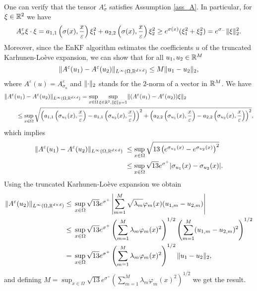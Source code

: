 One can verify that the tensor $A^{\varepsilon}_{\sigma}$ satisfies Assumption \ref{ass_A}. In particular, for $\xi \in \mathbb{R}^2$ we have
\begin{equation*}
A^{\varepsilon}_{\sigma} \xi \cdot \xi = a_{1,1} \left ( \sigma(x), \frac{x}{\varepsilon} \right ) \xi_1^2 + a_{2,2} \left ( \sigma(x), \frac{x}{\varepsilon} \right ) \xi_2^2 \ge e^{\sigma(x)} ( \xi_1^2 + \xi_2^2 ) = e^{\sigma_-} \lVert\xi\rVert_2^2.
\end{equation*}
Moreover, since the $\mathrm{EnKF}$ algorithm estimates the coefficients $u$ of the truncated Karhunen-Lo\`eve expansion, we can show that for all $u_1, u_2 \in \mathbb{R}^M$
\begin{equation*}
\lVert A^{\varepsilon}(u_1) - A^{\varepsilon}(u_2)\rVert_{L^{\infty}(\Omega, \mathbb{R}^{d \times d})} \le M \lVert u_1 - u_2\rVert_2,
\end{equation*}
where $A^{\varepsilon}(u) = A^{\varepsilon}_{\sigma_u}$ and $\lVert\cdot\rVert_2$ stands for the $2$-norm of a vector in $\mathbb{R}^M$. We have
\begin{align*}
& \lVert A^{\varepsilon}(u_1) - A^{\varepsilon}(u_2)\rVert_{L^{\infty}(\Omega, \mathbb{R}^{d \times d})} =  \sup_{x \in \Omega} \sup_{\xi \in \mathbb{R}^2, \lVert\xi\rVert_2=1} \lVert(A^{\varepsilon}(u_1) - A^{\varepsilon}(u_2)) \xi\rVert_2 \\
& \qquad \le \sup_{x \in \Omega} \sqrt{\left ( a_{1,1} \left ( \sigma_{u_1}(x), \frac{x}{\varepsilon} \right ) - a_{1,1} \left ( \sigma_{u_2}(x), \frac{x}{\varepsilon} \right ) \right )^2 + \left ( a_{2,2} \left ( \sigma_{u_1}(x), \frac{x}{\varepsilon} \right ) - a_{2,2} \left ( \sigma_{u_2}(x), \frac{x}{\varepsilon} \right ) \right )^2},
\end{align*}
which implies
\begin{align*}
\lVert A^{\varepsilon}(u_1) - A^{\varepsilon}(u_2)\rVert_{L^{\infty}(\Omega, \mathbb{R}^{d \times d})} & \; \le \sup_{x \in \Omega} \sqrt{13 \left ( e^{\sigma_{u_1}(x)} - e^{\sigma_{u_2}(x)} \right )^2} \\
& \; \le \sup_{x \in \Omega} \sqrt{13} e^{\sigma^+} \lvert\sigma_{u_1}(x) - \sigma_{u_2}(x)\rvert.
\end{align*}
Using the truncated Karhunen-Lo\`eve expansion we obtain
\begin{align*}
\lVert A^{\varepsilon}(u_2)\rVert_{L^{\infty}(\Omega, \mathbb{R}^{d \times d})} \le & \; \sup_{x \in \Omega} \sqrt{13} e^{\sigma^+} \left | \sum_{m=1}^M \sqrt{\lambda_m} \varphi_m(x) (u_{1,m} - u_{2,m}) \right | \\
\le & \; \sup_{x \in \Omega} \sqrt{13} e^{\sigma^+} \left ( \sum_{m=1}^M \lambda_m \varphi_m(x)^2 \right )^{1/2} \left ( \sum_{m=1}^M (u_{1,m} - u_{2,m})^2 \right )^{1/2} \\
= & \; \sup_{x \in \Omega} \sqrt{13} e^{\sigma^+} \left ( \sum_{m=1}^M \lambda_m \varphi_m(x)^2 \right )^{1/2} \lVert u_1 - u_2\rVert_2,
\end{align*}
and defining $M = \sup_{x \in \Omega} \sqrt{13} e^{\sigma^+} \left ( \sum_{m=1}^M \lambda_m \varphi_m(x)^2 \right )^{1/2}$ we get the result.

